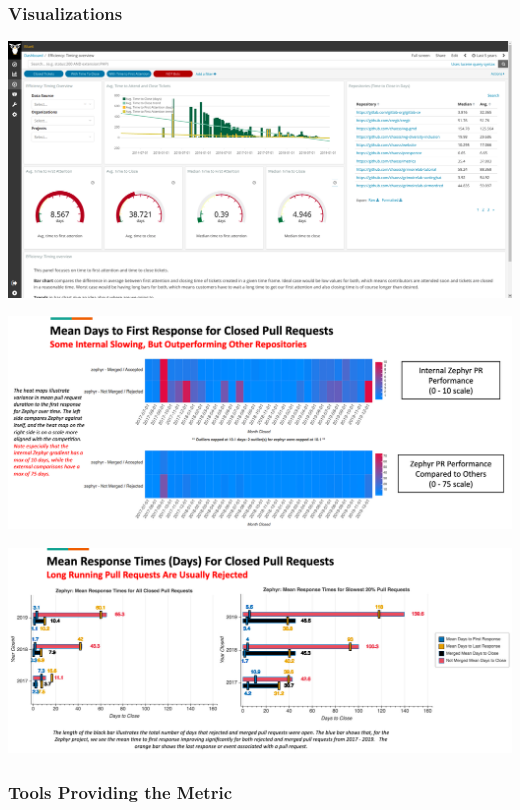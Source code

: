 \hypertarget{visualizations}{%
\subsubsection{Visualizations}\label{visualizations}}

\includegraphics{images/time-to-first-response_efficiency-timing-overview.png}

\includegraphics{images/time-to-first-response_augur-ttc-1.png}

\includegraphics{images/time-to-first-response_augur-ttc-2.png}

\hypertarget{tools-providing-the-metric}{%
\subsubsection{Tools Providing the
Metric}\label{tools-providing-the-metric}}


